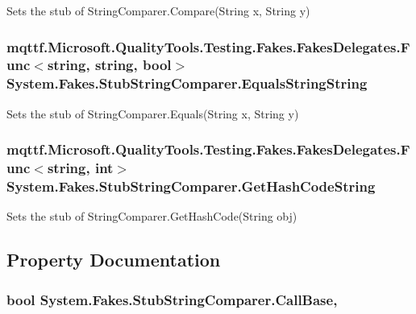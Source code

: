 Sets the stub of String\-Comparer.\-Compare(\-String x, String y)

\hypertarget{class_system_1_1_fakes_1_1_stub_string_comparer_a10e03286eff3cb4447141a16ca69e2c8}{
\subsubsection[{Equals\-String\-String}]{\setlength{\rightskip}{0pt plus 5cm}mqttf.\-Microsoft.\-Quality\-Tools.\-Testing.\-Fakes.\-Fakes\-Delegates.\-Func$<$string, string, bool$>$ System.\-Fakes.\-Stub\-String\-Comparer.\-Equals\-String\-String}}\label{class_system_1_1_fakes_1_1_stub_string_comparer_a10e03286eff3cb4447141a16ca69e2c8}


Sets the stub of String\-Comparer.\-Equals(\-String x, String y)

\hypertarget{class_system_1_1_fakes_1_1_stub_string_comparer_a22f4101e8845d255afdacdb91f428827}{
\subsubsection[{Get\-Hash\-Code\-String}]{\setlength{\rightskip}{0pt plus 5cm}mqttf.\-Microsoft.\-Quality\-Tools.\-Testing.\-Fakes.\-Fakes\-Delegates.\-Func$<$string, int$>$ System.\-Fakes.\-Stub\-String\-Comparer.\-Get\-Hash\-Code\-String}}\label{class_system_1_1_fakes_1_1_stub_string_comparer_a22f4101e8845d255afdacdb91f428827}


Sets the stub of String\-Comparer.\-Get\-Hash\-Code(\-String obj)



\subsection{Property Documentation}
\hypertarget{class_system_1_1_fakes_1_1_stub_string_comparer_adc4b05118ad0e46fedb34697683a112a}{
\subsubsection[{Call\-Base}]{\setlength{\rightskip}{0pt plus 5cm}bool System.\-Fakes.\-Stub\-String\-Comparer.\-Call\-Base\hspace{0.3cm}{\ttfamily [get]}, {\ttfamily [set]}}}\label{class_system_1_1_fakes_1_1_stub_string_comparer_adc4b05118ad0e46fedb34697683a112a}



